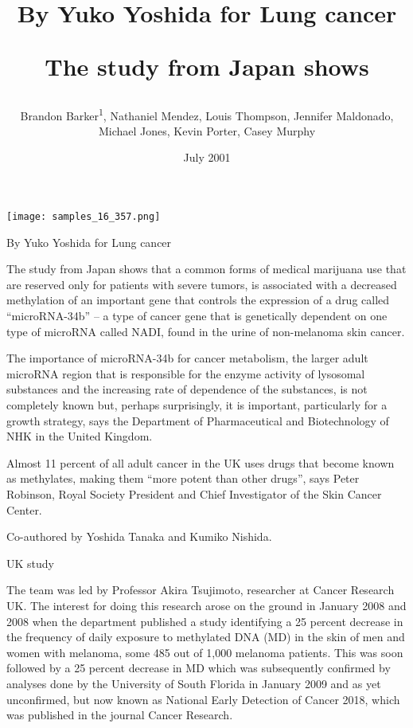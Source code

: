 \documentclass{article}
\title{By Yuko Yoshida for Lung cancer

The study from Japan shows}
\author{Brandon Barker\textsuperscript{1},  Nathaniel Mendez,  Louis Thompson,  Jennifer Maldonado,  Michael Jones,  Kevin Porter,  Casey Murphy}
\affil{\textsuperscript{1}Tehran University of Medical Sciences}
\date{July 2001}
\begin{document}
\maketitle

\begin{center}
\begin{minipage}{0.75\linewidth}
\texttt{[image: samples\_16\_357.png]}
\end{minipage}
\end{center}

By Yuko Yoshida for Lung cancer

The study from Japan shows that a common forms of medical marijuana use that are reserved only for patients with severe tumors, is associated with a decreased methylation of an important gene that controls the expression of a drug called “microRNA-34b” – a type of cancer gene that is genetically dependent on one type of microRNA called NADI, found in the urine of non-melanoma skin cancer.

The importance of microRNA-34b for cancer metabolism, the larger adult microRNA region that is responsible for the enzyme activity of lysosomal substances and the increasing rate of dependence of the substances, is not completely known but, perhaps surprisingly, it is important, particularly for a growth strategy, says the Department of Pharmaceutical and Biotechnology of NHK in the United Kingdom.

Almost 11 percent of all adult cancer in the UK uses drugs that become known as methylates, making them “more potent than other drugs”, says Peter Robinson, Royal Society President and Chief Investigator of the Skin Cancer Center.

Co-authored by Yoshida Tanaka and Kumiko Nishida.

UK study

The team was led by Professor Akira Tsujimoto, researcher at Cancer Research UK. The interest for doing this research arose on the ground in January 2008 and 2008 when the department published a study identifying a 25 percent decrease in the frequency of daily exposure to methylated DNA (MD) in the skin of men and women with melanoma, some 485 out of 1,000 melanoma patients. This was soon followed by a 25 percent decrease in MD which was subsequently confirmed by analyses done by the University of South Florida in January 2009 and as yet unconfirmed, but now known as National Early Detection of Cancer 2018, which was published in the journal Cancer Research.
\end{document}
